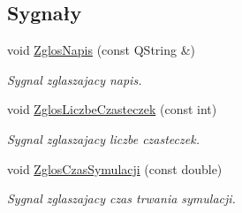 \subsection*{Sygnały}
\begin{DoxyCompactItemize}
\item 
void \hyperlink{class_zbiornik_a2d92e4a46f9a5dda37ddd9948046580b}{Zglos\-Napis} (const Q\-String \&)
\begin{DoxyCompactList}\small\item\em Sygnal zglaszajacy napis. \end{DoxyCompactList}\item 
void \hyperlink{class_zbiornik_ad200a7e5bc038ad94131d1a354266889}{Zglos\-Liczbe\-Czasteczek} (const int)
\begin{DoxyCompactList}\small\item\em Sygnal zglaszajacy liczbe czasteczek. \end{DoxyCompactList}\item 
void \hyperlink{class_zbiornik_a96b9ee7d80fc0f29787dc060027d2805}{Zglos\-Czas\-Symulacji} (const double)
\begin{DoxyCompactList}\small\item\em Sygnal zglaszajacy czas trwania symulacji. \end{DoxyCompactList}\end{DoxyCompactItemize}
